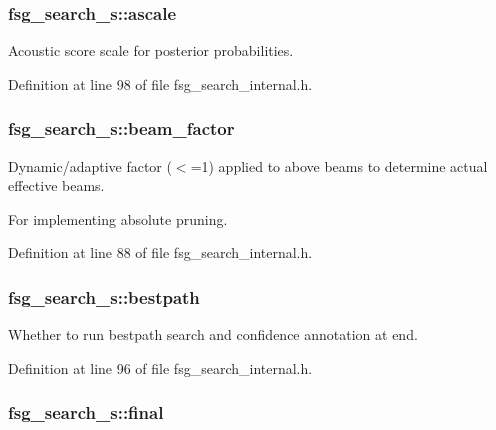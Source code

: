 \subsubsection[{ascale}]{ {\bf fsg\-\_\-search\-\_\-s\-::ascale}}\label{structfsg__search__s_a4d13fff2e14882b0125386fc27a4097f}


\-Acoustic score scale for posterior probabilities. 



\-Definition at line 98 of file fsg\-\_\-search\-\_\-internal.\-h.

\subsubsection[{beam\-\_\-factor}]{ {\bf fsg\-\_\-search\-\_\-s\-::beam\-\_\-factor}}\label{structfsg__search__s_a8e86d9f82189f8429d71ee2f67ecaaa2}


\-Dynamic/adaptive factor ($<$=1) applied to above beams to determine actual effective beams. 

\-For implementing absolute pruning. 

\-Definition at line 88 of file fsg\-\_\-search\-\_\-internal.\-h.

\subsubsection[{bestpath}]{ {\bf fsg\-\_\-search\-\_\-s\-::bestpath}}\label{structfsg__search__s_aba7eff57919c5a1de55eab3a62ff055a}


\-Whether to run bestpath search and confidence annotation at end. 



\-Definition at line 96 of file fsg\-\_\-search\-\_\-internal.\-h.

\subsubsection[{final}]{ {\bf fsg\-\_\-search\-\_\-s\-::final}}\label{structfsg__search__s_a5139d7ab35ae18407e06e78e1778f857}


